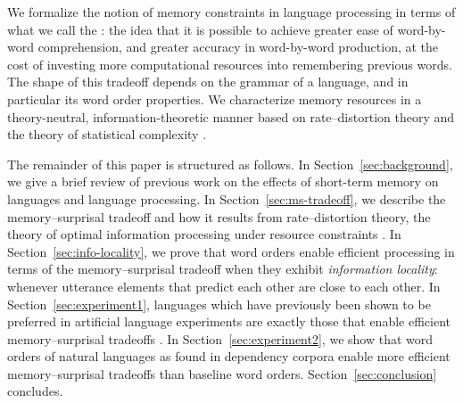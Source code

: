 We formalize the notion of memory constraints in language processing in terms of what we call the : the idea that it is possible to achieve greater ease of word-by-word comprehension, and greater accuracy in word-by-word production, at the cost of investing more computational resources into remembering previous words.
The shape of this tradeoff depends on the grammar of a language, and in particular its word order properties.
We characterize memory resources in a theory-neutral, information-theoretic manner based on rate--distortion theory \citep{cover2006elements} and the theory of statistical complexity \citep{crutchfield1989inferring}. %



The remainder of this paper is structured as follows. In Section~\ref{sec:background}, we give a brief review of previous work on the effects of short-term memory on languages and language processing. In Section~\ref{sec:ms-tradeoff}, we describe the memory--surprisal tradeoff and how it results from rate--distortion theory, the theory of optimal information processing under resource constraints \citep{cover2006elements}. In Section~\ref{sec:info-locality}, we prove that word orders enable efficient processing in terms of the memory--surprisal tradeoff when they exhibit \emph{information locality}: whenever utterance elements that predict each other are close to each other. In Section~\ref{sec:experiment1}, languages which have previously been shown to be preferred in artificial language experiments are exactly those that enable efficient memory--surprisal tradeoffs \citep{fedzechkina2017human}. In Section~\ref{sec:experiment2}, we show that word orders of natural languages as found in dependency corpora \citep{ud} enable more efficient memory--surprisal tradeoffs than baseline word orders. Section~\ref{sec:conclusion} concludes.



